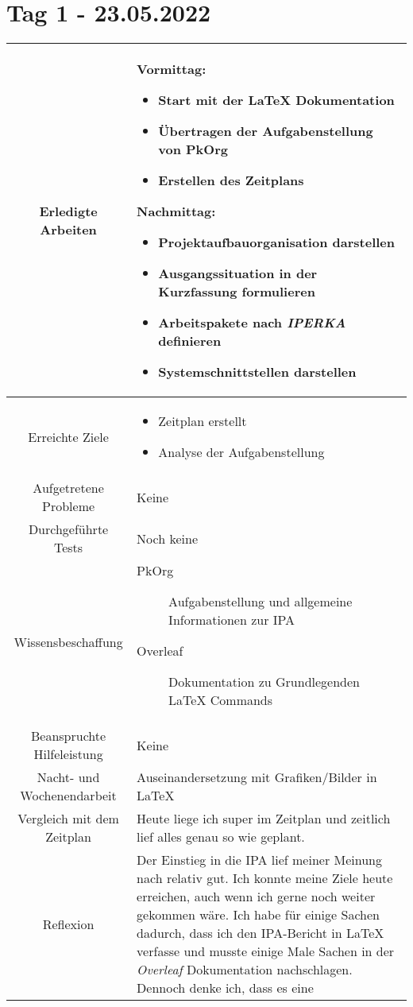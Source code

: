 \section{Tag 1 - 23.05.2022}

\begin{tabularx}{\textwidth}[H]{|c|X|}
  \hline
  Erledigte Arbeiten &
  \textbf{Vormittag:}
  \begin{itemize}
    \item Start mit der LaTeX Dokumentation
    \item Übertragen der Aufgabenstellung von PkOrg
    \item Erstellen des Zeitplans
  \end{itemize}
  \textbf{Nachmittag:}
  \begin{itemize}
    \item Projektaufbauorganisation darstellen
    \item Ausgangssituation in der Kurzfassung formulieren
    \item Arbeitspakete nach \emph{IPERKA} definieren
    \item Systemschnittstellen darstellen
  \end{itemize}
  \\ \hline

  Erreichte Ziele &
  \begin{itemize}
    \item Zeitplan erstellt
    \item Analyse der Aufgabenstellung
  \end{itemize}
  \\ \hline

  Aufgetretene Probleme &
  Keine
  \\ \hline

  Durchgeführte Tests &
  Noch keine
  \\ \hline

  Wissensbeschaffung &
  \begin{description}
    \item[PkOrg] Aufgabenstellung und allgemeine Informationen zur IPA
    \item[Overleaf] Dokumentation zu Grundlegenden LaTeX Commands
  \end{description}
  \\ \hline

  Beanspruchte Hilfeleistung &
  Keine
  \\ \hline

  Nacht- und Wochenendarbeit &
  Auseinandersetzung mit Grafiken/Bilder in LaTeX
  \\ \hline

  Vergleich mit dem Zeitplan &
  Heute liege ich super im Zeitplan und zeitlich lief alles genau so wie geplant.
  \\ \hline

  Reflexion &
  Der Einstieg in die IPA lief meiner Meinung nach relativ gut. Ich konnte meine Ziele heute erreichen, auch wenn ich gerne
  noch weiter gekommen wäre. Ich habe für einige Sachen  dadurch, dass ich den IPA-Bericht in LaTeX verfasse
  und musste einige Male Sachen in der \emph{Overleaf} Dokumentation nachschlagen. Dennoch denke ich, dass es eine
  \\ \hline
\end{tabularx}
